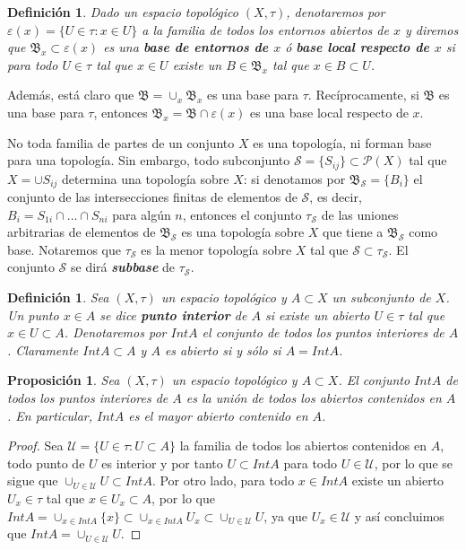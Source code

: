 \documentclass[12pt]{article}
\newtheorem{proposition}[theorem]{Proposición}
\newtheorem{definition}[theorem]{Definición}
\begin{document}
\begin{definition}Dado un espacio topológico $(X, \tau)$, denotaremos por $\varepsilon(x) = \lbrace U \in \tau: x \in U \rbrace$ a la familia de todos los entornos abiertos de $x$ y diremos que $\mathfrak{B}_x \subset \varepsilon (x)$ es una \textbf{base de entornos de $x$} ó \textbf{base local respecto de $x$} si para todo $U \in \tau$ tal que $x \in U$ existe un $B \in \mathfrak{B}_x$ tal que $x \in B \subset U$.
\end{definition}

Además, está claro que $\mathfrak{B} = \cup_x \mathfrak{B}_x$ es una base para $\tau$. Recíprocamente, si $\mathfrak{B}$ es una base para $\tau$, entonces $\mathfrak{B}_x = \mathfrak{B} \cap \varepsilon(x)$ es una base local respecto de $x$.

No toda familia de partes de un conjunto $X$ es una topología, ni forman base para una topología. Sin embargo, todo subconjunto $\mathcal{S} = \lbrace S_{ij} \rbrace \subset \mathcal{P}(X)$ tal que $X = \cup S_{ij}$ determina una topología sobre $X$: si denotamos por $\mathfrak{B}_{\mathcal{S}} = \lbrace B_i \rbrace$ el conjunto de las intersecciones finitas de elementos de $\mathcal{S}$, es decir, $B_i = S_{1i} \cap \ldots \cap S_{ni}$ para algún $n$, entonces el conjunto $\tau_{\mathcal{S}}$ de las uniones arbitrarias de elementos de $\mathfrak{B}_{\mathcal{S}}$ es una topología sobre $X$ que tiene a $\mathfrak{B}_{\mathcal{S}}$ como base. Notaremos que $\tau_{\mathcal{S}}$ es la menor topología sobre $X$ tal que $\mathcal{S} \subset \tau_{\mathcal{S}}$. El conjunto $\mathcal{S}$ se dirá \textbf{\textit{subbase}} de $\tau_{\mathcal{S}}$.

\begin{definition}Sea $(X, \tau)$ un espacio topológico y $A \subset X$ un subconjunto de $X$. Un punto $x \in A$ se dice \textbf{punto interior} de $A$ si existe un abierto $U \in \tau$ tal que $x \in U \subset A$. Denotaremos por $Int A$ el conjunto de todos los puntos interiores de $A$. Claramente $Int A \subset A$ y $A$ es abierto si y sólo si $A = Int A$.
\end{definition}

\begin{proposition}Sea $(X,\tau)$ un espacio topológico y $A \subset X$. El conjunto $Int A$ de todos los puntos interiores de $A$ es la unión de todos los abiertos contenidos en $A$. En particular, $Int A$ es el mayor abierto contenido en $A$.
\end{proposition}
\begin{proof}
Sea $\mathcal{U} = \lbrace U\in \tau: U \subset A \rbrace$ la familia de todos los abiertos contenidos en $A$, todo punto de $U$ es interior y por tanto $U \subset Int A$ para todo $U \in \mathcal{U}$, por lo que se sigue que $\cup_{U \in \mathcal{U}} U \subset Int A$. Por otro lado, para todo $x \in Int A$ existe un abierto $U_x \in \tau$ tal que $x \in U_x \subset A$, por lo que $Int A = \cup_{x\in Int A} \lbrace x \rbrace \subset \cup_{x\in Int A}U_x \subset \cup_{U \in \mathcal{U}} U$, ya que $U_x \in \mathcal{U}$ y así concluimos que $Int A = \cup_{U \in \mathcal{U}} U$.

\end{proof}
\end{document}
